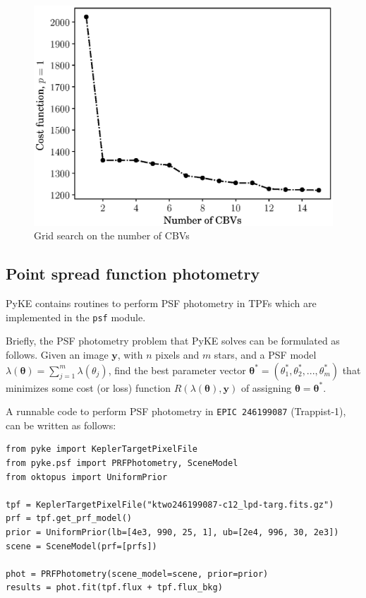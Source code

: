 \documentclass{article}
\begin{document}
\begin{figure}[!htb]
    \centering
    \includegraphics[scale=.5]{figs/cbv-grid-search.eps}
    \caption{Grid search on the number of CBVs}
    \label{fig:cbv-grid-search}
\end{figure}

\subsection{Point spread function photometry}

PyKE contains routines to perform PSF photometry in TPFs
which are implemented in the \texttt{psf} module.

Briefly, the PSF photometry problem that PyKE solves can be formulated as
follows. Given an image $\bm{y}$, with $n$ pixels and $m$ stars, and a PSF model
$\lambda(\bm{\theta}) = \sum_{j=1}^{m} \lambda({\theta}_j)$,
find the best parameter vector
$\bm{\theta}^{*} = (\theta_1^{*}, \theta_2^{*}, ..., \theta_m^{*})$
that minimizes some cost (or loss) function $R(\lambda(\bm{\theta}), \bm{y})$
of assigning $\bm{\theta} = \bm{\theta}^{*}$.

A runnable code to perform PSF photometry in \texttt{EPIC 246199087}
(Trappist-1), can be written as follows:

\begin{verbatim}
from pyke import KeplerTargetPixelFile
from pyke.psf import PRFPhotometry, SceneModel
from oktopus import UniformPrior

tpf = KeplerTargetPixelFile("ktwo246199087-c12_lpd-targ.fits.gz")
prf = tpf.get_prf_model()
prior = UniformPrior(lb=[4e3, 990, 25, 1], ub=[2e4, 996, 30, 2e3])
scene = SceneModel(prf=[prfs])

phot = PRFPhotometry(scene_model=scene, prior=prior)
results = phot.fit(tpf.flux + tpf.flux_bkg)
\end{verbatim}
\end{document}
